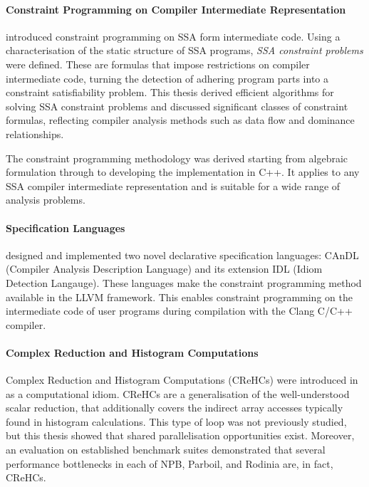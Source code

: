     \paragraph*{Constraint Programming on Compiler Intermediate Representation}
     introduced constraint programming on
    SSA form intermediate code.
    Using a characterisation of the static structure of SSA programs,
    {\it SSA constraint problems} were defined.
    These are formulas that impose restrictions on compiler intermediate code,
    turning the detection of adhering program parts into a constraint
    satisfiability problem.
    This thesis derived efficient algorithms for solving SSA constraint problems
    and discussed significant classes of constraint formulas, reflecting
    compiler analysis methods such as data flow and dominance relationships.

    The constraint programming methodology was derived starting from algebraic
    formulation through to developing the implementation in C++.
    It applies to any SSA compiler intermediate representation and is suitable
    for a wide range of analysis problems.

    \paragraph*{Specification Languages}
     designed and implemented two novel
    declarative specification languages: CAnDL (Compiler Analysis
    Description Language) and its extension IDL (Idiom Detection Langauge).
    These languages make the constraint programming method available in the
    LLVM framework.
    This enables constraint programming on the intermediate code of user
    programs during compilation with the Clang C/C++ compiler.

    \paragraph*{Complex Reduction and Histogram Computations}
    Complex Reduction and Histogram Computations (CReHCs) were introduced in
     as a computational idiom.
    CReHCs are a generalisation of the well-understood scalar reduction, that
    additionally covers the indirect array accesses typically found in histogram
    calculations.
    This type of loop was not previously studied, but this thesis showed that
    shared parallelisation opportunities exist.
    Moreover, an evaluation on established benchmark suites demonstrated
    that several performance bottlenecks in each of NPB, Parboil, and
    Rodinia are, in fact,  CReHCs.

